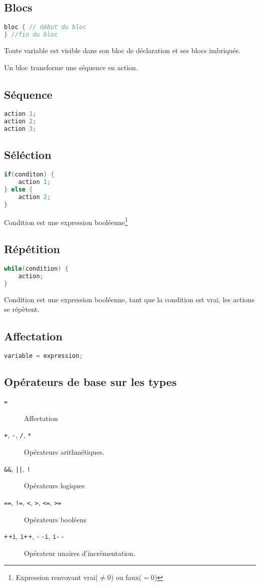 \documentclass[12pt,a4paper,openany]{book}
\begin{document}
	\subsection{Blocs}
\begin{lstlisting}[language=C, caption=Syntaxe d'un bloc]
bloc { // début du bloc
} //fin du bloc
\end{lstlisting}
	Toute variable est visible dans son bloc de déclaration et ses blocs imbriqués.

	Un bloc transforme une séquence en action.

	\subsection{Séquence}
\begin{lstlisting}[language=C, caption=Syntaxe des actions]
action 1;
action 2;
action 3;
\end{lstlisting}
	\subsection{Séléction}
\begin{lstlisting}[language=C, caption=Syntaxe d'une structure de contrôle]
if(conditon) {
	action 1;
} else {
	action 2;
}
\end{lstlisting}
Condition est une expression booléenne\footnote{Expression renvoyant vrai($\neq 0$) ou faux($=0$)} %

\subsection{Répétition}
\begin{lstlisting}[language=C, caption=Syntaxe de répétition]
while(condition) {
	action;
}
\end{lstlisting}
Condition est une expression booléenne, tant que la condition est vrai, les actions se répètent.

\subsection{Affectation}
\begin{lstlisting}[language=C, caption=Syntaxe d'une affectation ]
variable = expression;
\end{lstlisting}
\subsection{Opérateurs de base sur les types}
\begin{description}
	\item[\texttt{=}] Affectation
	\item[\texttt{+}, \texttt{-}, \texttt{/}, \texttt{*}] Opérateurs arithmétiques.
	\item[\texttt{\&\&}, \texttt{||}, \texttt{!}] Opérateurs logiques 
	\item[\texttt{==}, \texttt{!=}, \texttt{<}, \texttt{>}, \texttt{<=}, \texttt{>=}] Opérateurs booléens
	\item[\texttt{+$\,$+i}, \texttt{i+$\,$+}, \texttt{-$\,$-i}, \texttt{i-$\,$-}] Opérateur unaires d'incrémentation.
\end{description}
\end{document}
